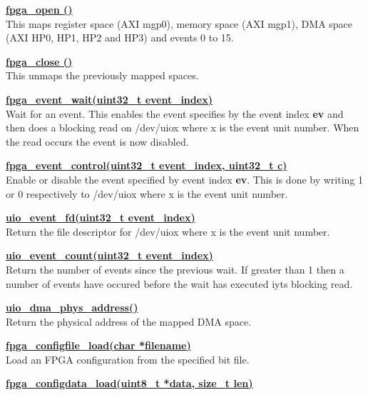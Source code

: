             \underline{{\bf fpga\_open ()}} \\

                This maps register space (AXI mgp0), memory space (AXI mgp1), DMA space (AXI HP0, HP1, HP2 and
                HP3) and events 0 to 15.

            \underline{{\bf fpga\_close ()}} \\

                This unmaps the previously mapped spaces.

            \underline{{\bf fpga\_event\_wait(uint32\_t event\_index)}} \\

                Wait for an event. This enables the event specifies by the event index {\bf ev}
                and then does a blocking read on /dev/uiox where x is the event unit number. When
                the read occurs the event is now disabled.

            \underline{{\bf fpga\_event\_control(uint32\_t event\_index, uint32\_t c)}} \\

                Enable or disable the event specified by event index {\bf ev}. This is done by
                writing 1 or 0 respectively to /dev/uiox where x is the event unit number.

            \underline{{\bf uio\_event\_fd(uint32\_t event\_index)}} \\

                Return the file descriptor for /dev/uiox where x is the event unit number.

            \underline{{\bf uio\_event\_count(uint32\_t event\_index)}} \\

                Return the number of events since the previous wait. If greater than 1 then
                a number of events have occured before the wait has executed iyts blocking read.

            \underline{{\bf uio\_dma\_phys\_address()}} \\

                Return the physical address of the mapped DMA space.

            \underline{{\bf fpga\_configfile\_load(char *filename)}} \\

                Load an FPGA configuration from the specified bit file.

            \underline{{\bf fpga\_configdata\_load(uint8\_t *data, size\_t len)}} \\

